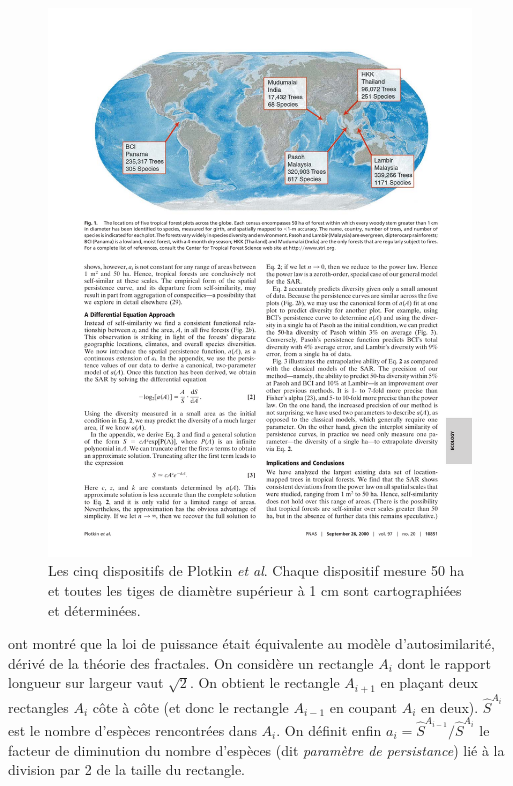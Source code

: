 \documentclass[
  11pt,
  french,
  a4paper,
  extrafontsizes,onecolumn,openright
  ]{memoir}
\begin{document}
\begin{figure}

{\centering \includegraphics[width=0.8\linewidth]{images/CTFS} 

}

\caption{Les cinq dispositifs de Plotkin \emph{et al}. Chaque dispositif mesure 50 ha et toutes les tiges de diamètre supérieur à 1 cm sont cartographiées et déterminées.}\label{fig:CTFS}
\end{figure}

\normalsize

\textcite{Harte1999} ont montré que la loi de puissance était équivalente au modèle d'autosimilarité, dérivé de la théorie des fractales.
On considère un rectangle \(A_i\) dont le rapport longueur sur largeur vaut \(\sqrt{2}\).
On obtient le rectangle \(A_{i+1}\) en plaçant deux rectangles \(A_i\) côte à côte (et donc le rectangle \(A_{i-1}\) en coupant \(A_i\) en deux).
\(\hat{S}^{A_i}\) est le nombre d'espèces rencontrées dans \(A_i\).
On définit enfin \(a_i=\hat{S}^{A_{i-1}}/\hat{S}^{A_i}\) le facteur de diminution du nombre d'espèces (dit \emph{paramètre de persistance}) lié à la division par 2 de la taille du rectangle.



\scriptsize
\end{document}
